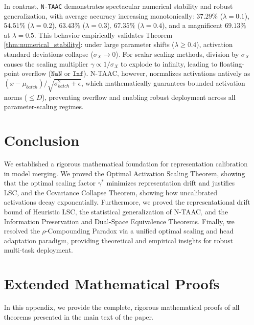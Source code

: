 \documentclass{article}
\theoremstyle{plain}
\theoremstyle{definition}
\theoremstyle{remark}
\begin{document}
In contrast, \texttt{N-TAAC} demonstrates spectacular numerical stability and robust generalization, with average accuracy increasing monotonically: $37.29\%$ ($\lambda=0.1$), $54.51\%$ ($\lambda=0.2$), $63.43\%$ ($\lambda=0.3$), $67.35\%$ ($\lambda=0.4$), and a magnificent $69.13\%$ at $\lambda=0.5$. This behavior empirically validates Theorem \ref{thm:numerical_stability}: under large parameter shifts ($\lambda \ge 0.4$), activation standard deviations collapse ($\sigma_X \to 0$). For scalar scaling methods, division by $\sigma_X$ causes the scaling multiplier $\gamma \propto 1/\sigma_X$ to explode to infinity, leading to floating-point overflow ($\texttt{NaN}$ or $\texttt{Inf}$). N-TAAC, however, normalizes activations natively as $(x - \mu_{batch}) / \sqrt{\sigma_{batch}^2 + \epsilon}$, which mathematically guarantees bounded activation norms ($\le D$), preventing overflow and enabling robust deployment across all parameter-scaling regimes.

\section{Conclusion}
We established a rigorous mathematical foundation for representation calibration in model merging. We proved the Optimal Activation Scaling Theorem, showing that the optimal scaling factor $\gamma^*$ minimizes representation drift and justifies LSC, and the Covariance Collapse Theorem, showing how uncalibrated activations decay exponentially. Furthermore, we proved the representational drift bound of Heuristic LSC, the statistical generalization of N-TAAC, and the Information Preservation and Dual-Space Equivalence Theorems. Finally, we resolved the $\rho$-Compounding Paradox via a unified optimal scaling and head adaptation paradigm, providing theoretical and empirical insights for robust multi-task deployment.




\newpage
\appendix
\onecolumn
\section{Extended Mathematical Proofs}
In this appendix, we provide the complete, rigorous mathematical proofs of all theorems presented in the main text of the paper.
\end{document}

